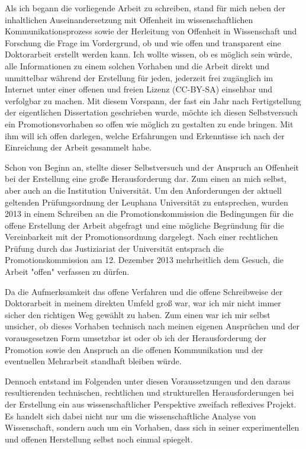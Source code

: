 \begin{vorspann}
Als ich begann die vorliegende Arbeit zu schreiben, stand für mich neben der inhaltlichen Auseinandersetzung mit Offenheit im wissenschaftlichen Kommunikationsprozess sowie der Herleitung von Offenheit in Wissenschaft und Forschung die Frage im Vordergrund, ob und wie offen und transparent eine Doktorarbeit erstellt werden kann. Ich wollte wissen, ob es möglich sein würde, alle Informationen zu einem solchen Vorhaben und die Arbeit direkt und unmittelbar während der Erstellung für jeden, jederzeit frei zugänglich im Internet unter einer offenen und freien Lizenz (CC-BY-SA) einsehbar und verfolgbar zu machen. Mit diesem Vorspann, der fast ein Jahr nach Fertigstellung der eigentlichen Dissertation geschrieben wurde, möchte ich diesen Selbstversuch ein Promotionsvorhaben so offen wie möglich zu gestalten zu ende bringen. Mit ihm will ich offen darlegen, welche Erfahrungen und Erkenntisse ich nach der Einreichung der Arbeit gesammelt habe.

Schon von Beginn an, stellte dieser Selbstversuch und der Anspruch an Offenheit bei der Erstellung eine große Herausforderung dar. Zum einen an mich selbst, aber auch an die Institution Universität. Um den Anforderungen der aktuell geltenden Prüfungsordnung der Leuphana Universität zu entsprechen, wurden 2013 in einem Schreiben an die Promotionskommission die Bedingungen für die offene Erstellung der Arbeit abgefragt und eine mögliche Begründung für die Vereinbarkeit mit der Promotionsordnung dargelegt. Nach einer rechtlichen Prüfung durch das Justiziariat der Universität entsprach die Promotionskommission am 12. Dezember 2013 mehrheitlich dem Gesuch, die Arbeit "offen" verfassen zu dürfen.

Da die Aufmerksamkeit das offene Verfahren und die offene Schreibweise der Doktorarbeit in meinem direkten Umfeld groß war, war ich mir nicht immer sicher den richtigen Weg gewählt zu haben. Zum einen war ich mir selbst unsicher, ob dieses Vorhaben technisch nach meinen eigenen Ansprüchen und der vorausgesetzen Form umsetzbar ist oder ob ich der Herausforderung der Promotion sowie den Anspruch an die offenen Kommunikation und der eventuellen Mehrarbeit standhaft bleiben würde.

Dennoch entstand im Folgenden unter diesen Voraussetzungen und den daraus resultierenden technischen, rechtlichen und strukturellen Herausforderungen bei der Erstellung ein aus wissenschaftlicher Perspektive zweifach reflexives Projekt. Es handelt sich dabei nicht nur um die wissenschaftliche Analyse von Wissenschaft, sondern auch um ein Vorhaben, dass sich in seiner experimentellen und offenen Herstellung selbst noch einmal spiegelt.


\end{vorspann}

